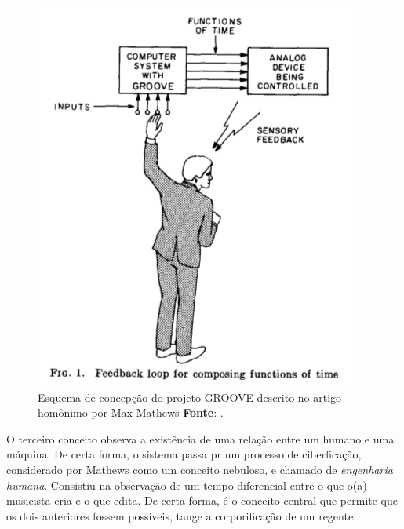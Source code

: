 \begin{figure}
\begin{center}
\includegraphics[scale=0.5]{./imagens/GROOVE.png}
\caption{Esquema de concepção do projeto GROOVE descrito no artigo homônimo por Max Mathews \textbf{Fonte}: \cite{mathews_groove_1970}.}
\label{fig:groove_sistema}
\end{center}
\end{figure} 

O terceiro conceito observa a existência de uma relação entre um humano e uma máquina. De certa forma, o sistema passa pr um  processo de ciberficação, considerado por Mathews como um conceito nebuloso, e chamado de \emph{engenharia humana}. Consistiu na observação de um tempo diferencial entre o que o(a) musicista cria e o que edita. De certa forma, é o conceito central que permite que os dois anteriores fossem possíveis, tange a corporificação de um regente:

